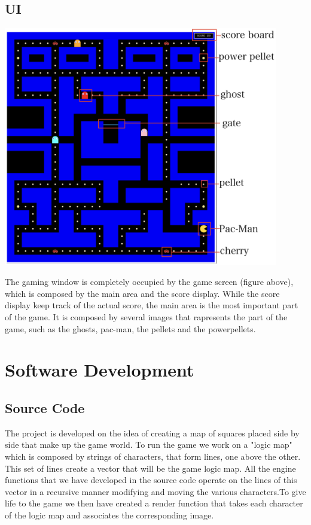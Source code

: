 \documentclass{article}
\begin{document}
 \subsection{UI}
\begin{center}
\includegraphics[width=12cm]{./images/user_interface.png}
\end{center}
The gaming window is completely occupied by the game screen (figure above), which is composed by the main area and the score display. While the score display keep track of the actual score, the main area is the most important part of the game. It is composed by several images that rapresents the part of the game, such as the ghosts, pac-man, the pellets and the powerpellets.

 \section{Software Development}

 \subsection{Source Code}
 The project is developed on the idea of creating a map of squares placed side by side that make up the game world. To run the game we work on a "logic map" which is composed by strings of characters, that form lines, one above the other. This set of lines create a vector that will be the game logic map. All the engine functions that we have developed in the source code operate on the lines of this vector in a recursive manner modifying and moving the various characters.To give life to the game we then have created a render function that takes each character of the logic map and associates the corresponding image.\\
 
\end{document}
